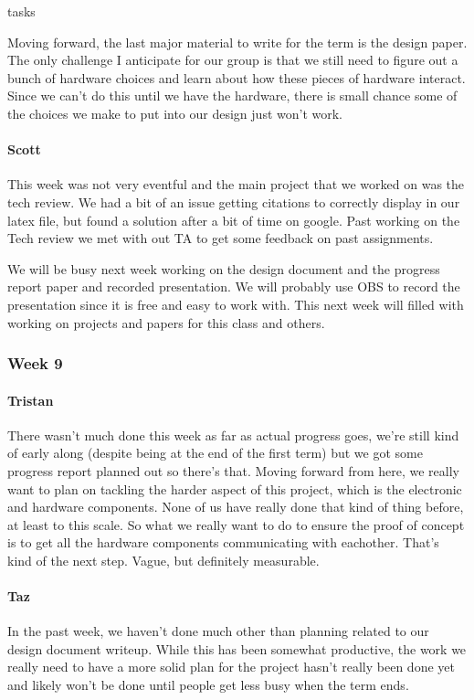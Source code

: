 tasks\documentclass[onecolumn, draftclsnofoot,10pt, compsoc]{IEEEtran}
\begin{document}
Moving forward, the last major material to write for the term is the design paper. The only challenge I anticipate for our group is that we still need to figure out a bunch of hardware choices and learn about how these pieces of hardware interact. Since we can't do this until we have the hardware, there is small chance some of the choices we make to put into our design just won't work.
\paragraph{Scott}
This week was not very eventful and the main project that we worked on was the tech review. We had a bit of an issue getting citations to correctly display in our latex file, but found a solution after a bit of time on google. Past working on the Tech review we met with out TA to get some feedback on past assignments.

We will be busy next week working on the design document and the progress report paper and recorded presentation. We will probably use OBS to record the presentation since it is free and easy to work with. This next week will filled with working on projects and papers for this class and others.
\subsubsection{Week 9}
\paragraph{Tristan}
There wasn't much done this week as far as actual progress goes, we're still kind of early along (despite being at the end of the first term) but we got some progress report planned out so there's that. Moving forward from here, we really want to plan on tackling the harder aspect of this project, which is the electronic and hardware components. None of us have really done that kind of thing before, at least to this scale. So what we really want to do to ensure the proof of concept is to get all the hardware components communicating with eachother. That's kind of the next step. Vague, but definitely measurable.

\paragraph{Taz}
In the past week, we haven't done much other than planning related to our design document writeup. While this has been somewhat productive, the work we really need to have a more solid plan for the project hasn't really been done yet and likely won't be done until people get less busy when the term ends.
\end{document}
